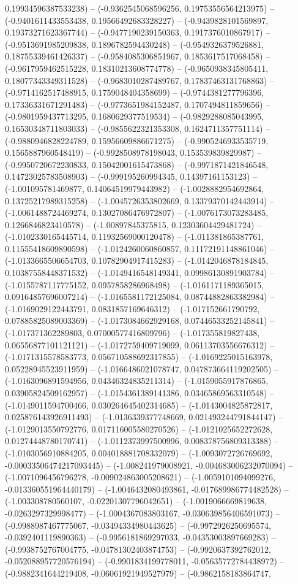0.19934596387533238) -- (-0.9362545068596256, 0.19753556564213975) -- (-0.9401611433553438, 0.19566492683328227) -- (-0.9439828101569897, 0.19373271623367744) -- (-0.9477190239150363, 0.1917376010867917) -- (-0.9513691985209838, 0.1896782594430248) -- (-0.9549326379526881, 0.18755339461426337) -- (-0.9584085306851967, 0.1853617517068458) -- (-0.9617959462515228, 0.18310213608774778) -- (-0.9650938345805411, 0.18077343349311528) -- (-0.9683010287489767, 0.17837463131768863) -- (-0.9714162517488915, 0.1759048404358699) -- (-0.9744381277796396, 0.17336331671291483) -- (-0.9773651984152487, 0.1707494811859656) -- (-0.9801959437713295, 0.1680629377519534) -- (-0.9829288085043995, 0.16530348711803033) -- (-0.9855622321353308, 0.1624711357751114) -- (-0.9880946828224789, 0.15956609886671275) -- (-0.9905246933535719, 0.1565887960548419) -- (-0.9928508978198043, 0.153539839829987) -- (-0.9950720672230833, 0.15042001615473868) -- (-0.9971871421846548, 0.14723025783508903) -- (-0.999195260994345, 0.14397161153123) -- (-1.001095781469877, 0.14064519979443982) -- (-1.0028882954692864, 0.13725217989315258) -- (-1.0045726353802669, 0.13379370142443914) -- (-1.0061488724469274, 0.13027086476972807) -- (-1.0076173073283485, 0.1266846823410578) -- (-1.00897845375815, 0.12303604429481724) -- (-1.0102330165445714, 0.11932569000120478) -- (-1.011381865387761, 0.11555418609890598) -- (-1.0124260060860857, 0.11172191148861046) -- (-1.0133665506654703, 0.10782904917415283) -- (-1.0142046878184845, 0.10387558448371532) -- (-1.0149416548149341, 0.09986130891903784) -- (-1.0155787117775152, 0.0957858286968498) -- (-1.0161171189365015, 0.09164857696007214) -- (-1.0165581172125084, 0.08744882863382984) -- (-1.0169029122443791, 0.0831857169646312) -- (-1.017152661790792, 0.07885825089003369) -- (-1.0173084662929168, 0.07446533252145841) -- (-1.017371362289803, 0.07000577416809796) -- (-1.017355819827438, 0.06556877101121121) -- (-1.0172759409719099, 0.06113703556676312) -- (-1.0171315578583773, 0.056710588692317855) -- (-1.0169225015163978, 0.05228945523911959) -- (-1.0166486021078747, 0.047873664119202505) -- (-1.0163096891594956, 0.04346324835211314) -- (-1.0159055917876865, 0.03905824509162957) -- (-1.0154361389141386, 0.03465869563310548) -- (-1.0149011594700466, 0.030264645402314685) -- (-1.0143004825872817, 0.025876143926911493) -- (-1.0136339377748669, 0.021493244791844147) -- (-1.0129013550792776, 0.017116005580270526) -- (-1.0121025652272628, 0.01274448780170741) -- (-1.0112373997500996, 0.008378756809313388) -- (-1.0103056910884205, 0.004018881708332079) -- (-1.0093072726769692, -0.00033506474217093445) -- (-1.008241979008921, -0.004683006232070094) -- (-1.0071096456796278, -0.009024863005208621) -- (-1.0059101094099276, -0.013360551964440179) -- (-1.0046432080493861, -0.017689986774482528) -- (-1.003308780560107, -0.02201307796042651) -- (-1.0019066669819638, -0.0263297329998477) -- (-1.0004367083803167, -0.030639856406591073) -- (-0.9988987467775067, -0.03494334980443625) -- (-0.9972926250695574, -0.0392401119890363) -- (-0.9956181869297033, -0.04353003897669283) -- (-0.9938752767004775, -0.04781302403874753) -- (-0.9920637392762012, -0.052088957720576194) -- (-0.9901834199778011, -0.05635772784438972) -- (-0.9882341644219408, -0.06061921949527979) -- (-0.9862158183864747, 